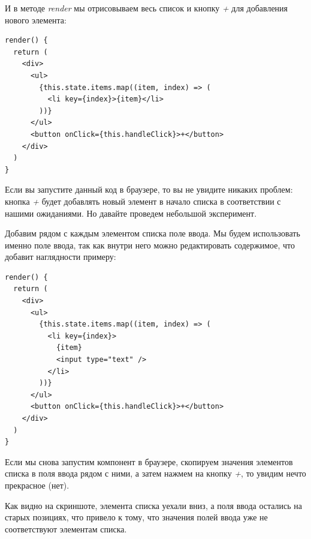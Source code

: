 И в методе \textit{render} мы отрисовываем весь список и кнопку \textit{+} для добавления нового элемента:

\begin{lstlisting}
render() {
  return (
    <div>
      <ul>
        {this.state.items.map((item, index) => (
          <li key={index}>{item}</li>
        ))}
      </ul>
      <button onClick={this.handleClick}>+</button>
    </div>
  )
}
\end{lstlisting}

Если вы запустите данный код в браузере, то вы не увидите никаких проблем: кнопка \textit{+} будет добавлять новый элемент в начало списка в соответствии с нашими ожиданиями. Но давайте проведем небольшой эксперимент.

Добавим рядом с каждым элементом списка поле ввода. Мы будем использовать именно поле ввода, так как внутри него можно редактировать содержимое, что добавит наглядности примеру:

\begin{lstlisting}
render() {
  return (
    <div>
      <ul>
        {this.state.items.map((item, index) => (
          <li key={index}>
            {item}
            <input type="text" />
          </li>
        ))}
      </ul>
      <button onClick={this.handleClick}>+</button>
    </div>
  )
}
\end{lstlisting}

Если мы снова запустим компонент в браузере, скопируем значения элементов списка в поля ввода рядом с ними, а затем нажмем на кнопку \textit{+}, то увидим нечто прекрасное (нет).

Как видно на скриншоте, элемента списка уехали вниз, а поля ввода остались на старых позициях, что привело к тому, что значения полей ввода уже не соответствуют элементам списка.

\begin{center}
\end{center}

